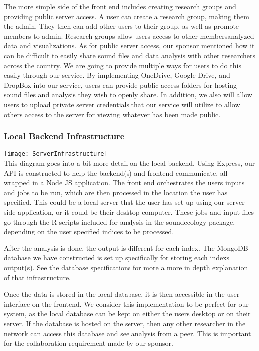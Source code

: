 The more simple side of the front end includes creating research groups and providing public server access. A user can create a research group, making them the admin. They then can add other users to their group, as well as promote members to admin. Research groups allow users access to other members\textquotesingle  analyzed data and visualizations. As for public server access, our sponsor mentioned how it can be difficult to easily share sound files and data analysis with other researchers across the country. We are going to provide multiple ways for users to do this easily through our service. By implementing OneDrive, Google Drive, and DropBox into our service, users can provide public access folders for hosting sound files and analysis they wish to openly share. In addition, we also will allow users to upload private server credentials that our service will utilize to allow others access to the server for viewing whatever has been made public.

\subsubsection{Local Backend Infrastructure}
\texttt{[image: ServerInfrastructure]} \\
This diagram goes into a bit more detail on the local backend. Using Express, our API is constructed to help the backend(s) and frontend communicate, all wrapped in a Node JS application. The front end orchestrates the user\textquotesingle s inputs and jobs to be run, which are then processed in the location the user has specified. This could be a local server that the user has set up using our server side application, or it could be their desktop computer. These jobs and input files go through the R scripts included for analysis in the soundecology package, depending on the user specified indices to be processed.\par
After the analysis is done, the output is different for each index. The MongoDB database we have constructed is set up specifically for storing each index\textquotesingle s output(s). See the database specifications for more a more in depth explanation of that infrastructure.\par
Once the data is stored in the local database, it is then accessible in the user interface on the frontend. We consider this implementation to be perfect for our system, as the local database can be kept on either the user\textquotesingle s desktop or on their server. If the database is hosted on the server, then any other researcher in the network can access this database and see analysis from a peer. This is important for the collaboration requirement made by our sponsor.

